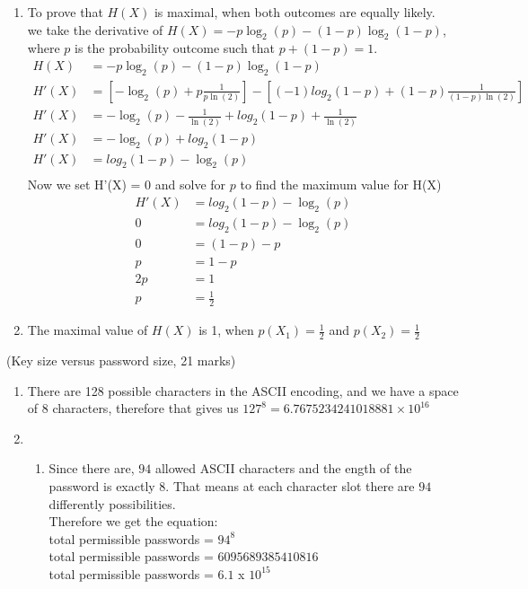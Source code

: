 \documentclass{assignment}
\begin{document}
\begin{problemlist}
\begin{problem}
\begin{answer}
\begin{enumerate}[label=(\alph*)]
	\item 	To prove that $H(X)$ is maximal, when both outcomes are equally likely. \\
			we take the derivative of  $H(X) = -p \log_2 (p) - (1-p) \log_2 (1-p)$, where $p$ is the probability 
			outcome such that $p + (1-p) = 1$. \\
			\begin{align*}
					H(X) &= -p \log_2 (p) - (1\!-\!p) \log_2 (1\!-\!p)\\
					H'(X) &= [  - \log_2(p)   + p \frac{1}{ p\ln(2)}] - [ (-1) log_2(1-p) + (1\!-\!p) \frac{1}{ (1-p)\ln(2)}  ]\\
					H'(X) &=  - \log_2(p) - \frac{1}{ \ln(2)}  + log_2(1-p) +  \frac{1}{ \ln(2)}  \\ 
					H'(X) &=  - \log_2(p) + log_2(1-p) \\ 
					H'(X) &=  log_2(1-p) - \log_2(p) \\ 
			\end{align*}
			Now we set H'(X) = 0 and solve for $p$ to find the maximum value for H(X) \\
			\begin{align*}
					H'(X) &=  log_2(1-p) - \log_2(p) \\ 
					0 &=  log_2(1-p) - \log_2(p) \\ 
					0 &=  (1-p) - p \\
					p & = 1 - p \\
					2p &= 1 \\
					p &= \frac{1}{2} 
			\end{align*}			
	\item 	The maximal value of $H(X)$ is 1, when $p(X_1) = \frac{1}{2}$ and $p(X_2) = \frac{1}{2}$
\end{enumerate}
\end{answer}
\end{problem}

\clearpage

\pbitem (Key size versus password size, 21 marks)
\begin{problem}
\begin{answer}
\begin{enumerate}[label=(\alph*)]
	\item	There are 128 possible characters in the ASCII encoding, and we have a space of 8 characters, therefore that gives us $127^8 = 6.7675234241018881 × 10^{16}$
	\item 	\begin{enumerate}[label=(\roman*)]
			\item Since there are, $94$ allowed ASCII characters and the ength of the password is exactly $8$. That means at each character slot there are $94$ differently possibilities.\\
			Therefore we get the equation:\\
				total permissible passwords = $94^8$ \\
				total permissible passwords = $6095689385410816$ \\
				total permissible passwords = $6.1$ x $10^{15}$ \\
			

\end{enumerate}
\end{enumerate}
\end{answer}
\end{problem}
\end{problemlist}
\end{document}
